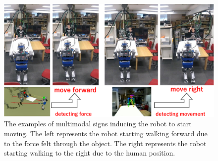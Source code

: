 \begin{figure}[htbp]
  \begin{center}
    \includegraphics[width=1.00\columnwidth]{figs/transition}
    \caption{The examples of multimodal signs inducing the robot to start moving. The left represents the robot starting walking forward due to the force felt through the object. The right represents the robot starting walking to the right due to the human position.}
    \label{figure:transition}
  \end{center}
\end{figure}
